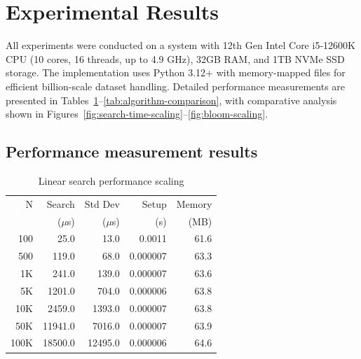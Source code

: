 \documentclass[sigconf]{acmart}
\begin{document}
\section{Experimental Results}
All experiments were conducted on a system with 12th Gen Intel Core i5-12600K CPU (10 cores, 16 threads, up to 4.9 GHz), 32GB RAM, and 1TB NVMe SSD storage. The implementation uses Python 3.12+ with memory-mapped files for efficient billion-scale dataset handling. Detailed performance measurements are presented in Tables~\ref{tab:linear-results}--\ref{tab:algorithm-comparison}, with comparative analysis shown in Figures~\ref{fig:search-time-scaling}--\ref{fig:bloom-scaling}.

\subsection{Performance measurement results}
\begin{table}[h]
\caption{Linear search performance scaling}
\scriptsize
\begin{tabular}{rrrrr}
\hline
N & Search & Std Dev & Setup & Memory \\
 & ($\mu$s) & ($\mu$s) & (s) & (MB) \\
\hline
100 & 25.0 & 13.0 & 0.0011 & 61.6 \\
500 & 119.0 & 68.0 & 0.000007 & 63.3 \\
1K & 241.0 & 139.0 & 0.000007 & 63.6 \\
5K & 1201.0 & 704.0 & 0.000006 & 63.8 \\
10K & 2459.0 & 1393.0 & 0.000007 & 63.8 \\
50K & 11941.0 & 7016.0 & 0.000007 & 63.9 \\
100K & 18500.0 & 12495.0 & 0.000006 & 64.6 \\
\hline
\end{tabular}
\label{tab:linear-results}
\end{table}
\end{document}
